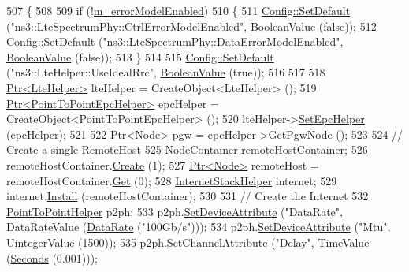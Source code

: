 \begin{DoxyCode}
507 \{
508 
509   \textcolor{keywordflow}{if} (!\hyperlink{classLenaPssFfMacSchedulerTestCase2_a0fe80fb7f4883b94e65d884651e6e404}{m\_errorModelEnabled})
510     \{
511       \hyperlink{group__config_ga2e7882df849d8ba4aaad31c934c40c06}{Config::SetDefault} (\textcolor{stringliteral}{"ns3::LteSpectrumPhy::CtrlErrorModelEnabled"}, 
      \hyperlink{classns3_1_1BooleanValue}{BooleanValue} (\textcolor{keyword}{false}));
512       \hyperlink{group__config_ga2e7882df849d8ba4aaad31c934c40c06}{Config::SetDefault} (\textcolor{stringliteral}{"ns3::LteSpectrumPhy::DataErrorModelEnabled"}, 
      \hyperlink{classns3_1_1BooleanValue}{BooleanValue} (\textcolor{keyword}{false}));
513     \}
514 
515   \hyperlink{group__config_ga2e7882df849d8ba4aaad31c934c40c06}{Config::SetDefault} (\textcolor{stringliteral}{"ns3::LteHelper::UseIdealRrc"}, 
      \hyperlink{classns3_1_1BooleanValue}{BooleanValue} (\textcolor{keyword}{true}));
516 
517 
518   \hyperlink{classns3_1_1Ptr}{Ptr<LteHelper>} lteHelper = CreateObject<LteHelper> ();
519   \hyperlink{classns3_1_1Ptr}{Ptr<PointToPointEpcHelper>}  epcHelper = CreateObject<PointToPointEpcHelper> ();
520   lteHelper->\hyperlink{classns3_1_1LteHelper_a324079a1ccd54ce949786b83d6b95915}{SetEpcHelper} (epcHelper);
521 
522   \hyperlink{classns3_1_1Ptr}{Ptr<Node>} pgw = epcHelper->GetPgwNode ();
523 
524   \textcolor{comment}{// Create a single RemoteHost}
525   \hyperlink{classns3_1_1NodeContainer}{NodeContainer} remoteHostContainer;
526   remoteHostContainer.\hyperlink{classns3_1_1NodeContainer_a787f059e2813e8b951cc6914d11dfe69}{Create} (1);
527   \hyperlink{classns3_1_1Ptr}{Ptr<Node>} remoteHost = remoteHostContainer.\hyperlink{classns3_1_1NodeContainer_a9ed96e2ecc22e0f5a3d4842eb9bf90bf}{Get} (0);
528   \hyperlink{classns3_1_1InternetStackHelper}{InternetStackHelper} internet;
529   internet.\hyperlink{classns3_1_1InternetStackHelper_a6645b412f31283d2d9bc3d8a95cebbc0}{Install} (remoteHostContainer);
530 
531   \textcolor{comment}{// Create the Internet}
532   \hyperlink{classns3_1_1PointToPointHelper}{PointToPointHelper} p2ph;
533   p2ph.\hyperlink{classns3_1_1PointToPointHelper_a4577f5ab8c387e5528af2e0fbab1152e}{SetDeviceAttribute} (\textcolor{stringliteral}{"DataRate"}, DataRateValue (\hyperlink{classns3_1_1DataRate}{DataRate} (\textcolor{stringliteral}{"100Gb/s"})));
534   p2ph.\hyperlink{classns3_1_1PointToPointHelper_a4577f5ab8c387e5528af2e0fbab1152e}{SetDeviceAttribute} (\textcolor{stringliteral}{"Mtu"}, UintegerValue (1500));
535   p2ph.\hyperlink{classns3_1_1PointToPointHelper_a6b5317fd17fb61e5a53f8d66a90b63b9}{SetChannelAttribute} (\textcolor{stringliteral}{"Delay"}, TimeValue (\hyperlink{group__timecivil_ga33c34b816f8ff6628e33d5c8e9713b9e}{Seconds} (0.001)));

\end{DoxyCode}
